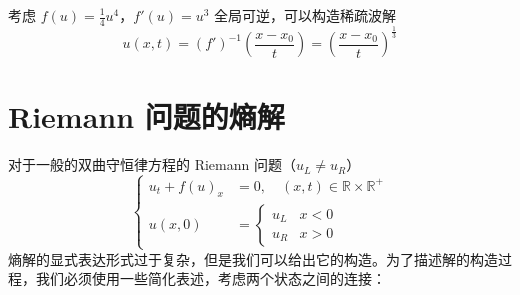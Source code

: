 \begin{example}
    考虑 $f(u) = \frac14 u^4$，$f'(u) = u^3$ 全局可逆，可以构造稀疏波解
    \[
        u(x,t) = (f')^{-1}\left(\frac{x-x_0}{t}\right) = \left(\frac{x-x_0}{t}\right)^{\frac13}
    \]
\end{example}

\section{Riemann 问题的熵解}

对于一般的双曲守恒律方程的 Riemann 问题（$u_L \neq u_R$）
\[
    \left\{
    \begin{aligned}
        u_t + f(u)_x & = 0,\quad (x,t) \in \mathbb{R} \times  \mathbb{R}^+ \\
        u(x,0)       & =
        \begin{cases}
            u_L & x < 0 \\
            u_R & x > 0
        \end{cases}
    \end{aligned}
    \right.
\]
熵解的显式表达形式过于复杂，但是我们可以给出它的构造。为了描述解的构造过程，我们必须使用一些简化表述，考虑两个状态之间的连接：
